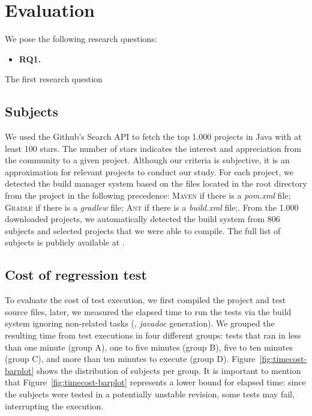 \section{Evaluation}

We pose the following research questions:

\newcommand{\RQONE}{\textbf{RQ1.}}
\newcommand{\rqOne}{\RQONE{}~}

\begin{itemize}
    \item \rqOne
\end{itemize}

The first research question 

\subsection{Subjects}
\label{sec:subjects}

We used the Github's Search API to fetch the top 1.000 projects in
Java with at least 100 stars. The number of stars indicates the
interest and appreciation from the community to a given project.
 Although our
criteria is subjective, it is an approximation for relevant projects
to conduct our study. For each project, we detected the build manager
system based on the files located in the root directory from the
project in the following precedence: \textsc{Maven} if there is a
\emph{pom.xml} file; \textsc{Gradle} if there is a \emph{gradlew}
file; \textsc{Ant} if there is a \emph{build.xml} file;. From the
1.000 downloaded projects, we automatically detected the build system
from 806 subjects and selected  projects that we were able to
compile.  The full list of subjects is publicly available at
.

\subsection{Cost of regression test}
\label{sec:timecost}

To evaluate the cost of test execution, we first compiled the project
and test source files, later, we measured the elapsed time to run the
tests via the build system ignoring non-related tasks (\eg,
\emph{javadoc} generation).  We grouped the resulting time from test
executions in four different groups: tests that ran in less than one
minute (group A), one to five minutes (group B), five to ten minutes
(group C), and more than ten minutes to execute (group D).
Figure~\ref{fig:timecost-barplot} shows the distribution of subjects
per group. It is important to mention that
Figure~\ref{fig:timecost-barplot} represents a lower bound for elapsed
time: since the subjects were tested in a potentially unstable
revision, some tests may fail, interrupting the execution.

